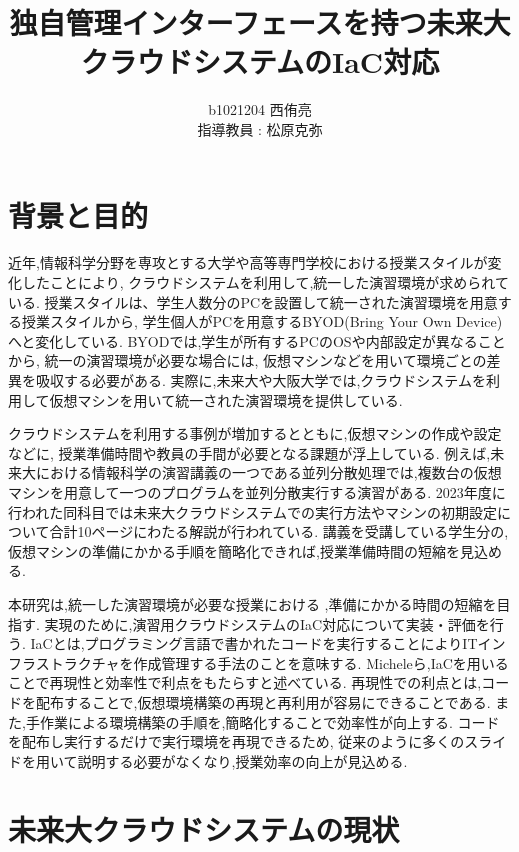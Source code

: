 \documentclass[11pt]{ujarticle}\sloppy
\author{%
b1021204 西侑亮\\指導教員 : 松原克弥
}
\title{独自管理インターフェースを持つ未来大クラウドシステムのIaC対応}
\begin{document}
\maketitle


\section{背景と目的}
\label{sec:intro}
近年,情報科学分野を専攻とする大学や高等専門学校における授業スタイルが変化したことにより,
クラウドシステムを利用して,統一した演習環境が求められている.
授業スタイルは、学生人数分のPCを設置して統一された演習環境を用意する授業スタイルから,
学生個人がPCを用意するBYOD(Bring Your Own Device)へと変化している\cite{byod}.
BYODでは,学生が所有するPCのOSや内部設定が異なることから,
統一の演習環境が必要な場合には,
仮想マシンなどを用いて環境ごとの差異を吸収する必要がある. 
実際に,未来大や大阪大学では,クラウドシステムを利用して仮想マシンを用いて統一された演習環境を提供している\cite{oosakadai}.


クラウドシステムを利用する事例が増加するとともに,仮想マシンの作成や設定などに,
授業準備時間や教員の手間が必要となる課題が浮上している.
例えば,未来大における情報科学の演習講義の一つである並列分散処理では,複数台の仮想マシンを用意して一つのプログラムを並列分散実行する演習がある.
2023年度に行われた同科目では未来大クラウドシステムでの実行方法やマシンの初期設定について合計10ページにわたる解説が行われている.
講義を受講している学生分の,仮想マシンの準備にかかる手順を簡略化できれば,授業準備時間の短縮を見込める.


本研究は,統一した演習環境が必要な授業における
,準備にかかる時間の短縮を目指す.
実現のために,演習用クラウドシステムのIaC対応について実装・評価を行う.
IaCとは,プログラミング言語で書かれたコードを実行することによりITインフラストラクチャを作成管理する手法のことを意味する\cite{O'Reilly Media}.
Micheleら\cite{InformationSystem},IaCを用いることで再現性と効率性で利点をもたらすと述べている.
再現性での利点とは,コードを配布することで,仮想環境構築の再現と再利用が容易にできることである.
また,手作業による環境構築の手順を,簡略化することで効率性が向上する.
コードを配布し実行するだけで実行環境を再現できるため,
従来のように多くのスライドを用いて説明する必要がなくなり,授業効率の向上が見込める.


\section{未来大クラウドシステムの現状}
\end{document}
